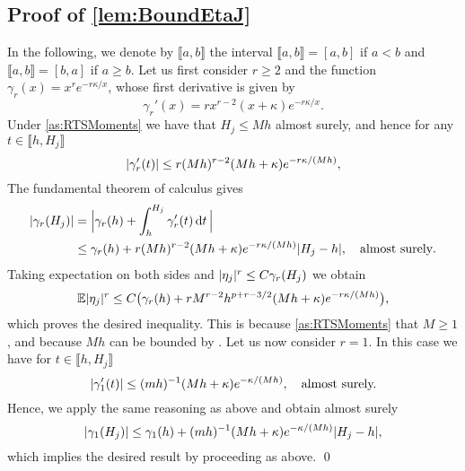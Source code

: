 \documentclass[10pt]{article}
\begin{document}
\subsection*{Proof of \cref{lem:BoundEtaJ}}
In the following, we denote by $\llbracket a, b \rrbracket$ the interval $\llbracket a, b \rrbracket = [a, b]$ if $a < b$ and $\llbracket a, b \rrbracket = [b, a]$ if $a \geq b$. Let us first consider $r \geq 2$ and the function $\gamma_r(x) = x^r e^{-r\kappa/x}$, whose first derivative is given by
	\begin{equation}
	\gamma_r'(x) = rx^{r-2}(x + \kappa) e^{-r\kappa/x}.
	\end{equation}
	Under \cref{as:RTSMoments} we have that $H_j \leq Mh$ almost surely, and hence for any $t \in \llbracket h, H_j\rrbracket$
	\begin{equation}
	\lvert\gamma_r'(t)\rvert \leq r (Mh)^{r-2} (Mh + \kappa)e^{-r\kappa/(Mh)},
	\end{equation}
	 The fundamental theorem of calculus gives
	\begin{equation}
	\begin{aligned}
	\lvert\gamma_r(H_j)\rvert &= \Big\lvert \gamma_r(h) + \int_{h}^{H_j} \gamma_r'(t) \,\mathrm{d} t \,\Big\rvert\\
	&\leq \gamma_r(h) + r (Mh)^{r-2} (Mh + \kappa)e^{-r\kappa/(Mh)} \lvert H_j - h\rvert, \quad \text{almost surely}.
	\end{aligned}
	\end{equation}
	Taking expectation on both sides and  $\lvert\eta_j\rvert^r \leq C\gamma_r(H_j)$ we obtain
	\begin{equation}
	\operatorname{\mathbb{E}}\lvert\eta_j\rvert^r \leq C\big(\gamma_r(h) + r M^{r-2} h^{p+r-3/2} (Mh + \kappa)e^{-r\kappa/(Mh)}\big),
	\end{equation} 
	which proves the desired inequality. This is because \cref{as:RTSMoments}  that $M \geq 1$, and because $Mh$ can be bounded by . Let us now consider $r = 1$. In this case we have for $t \in \llbracket h, H_j\rrbracket$
	\begin{equation}
	\lvert\gamma_1'(t)\rvert \leq (mh)^{-1} (Mh + \kappa)e^{-\kappa/(Mh)}, \quad \text{almost surely.}
	\end{equation}
	Hence, we apply the same reasoning as above and obtain almost surely
	\begin{equation}
	\lvert\gamma_1(H_j)\rvert \leq \gamma_1(h) + (mh)^{-1} (Mh + \kappa) e^{-\kappa/(Mh)} \lvert H_j - h\rvert,
	\end{equation}
	which implies the desired result by proceeding as above.  \qed
\end{document}
